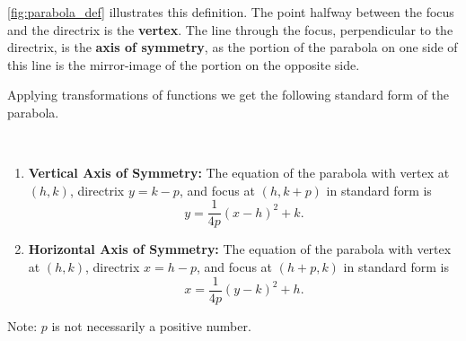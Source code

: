 \autoref{fig:parabola_def} illustrates this definition. The point halfway between the focus and the directrix is the \textbf{vertex}. The line through the focus, perpendicular to the directrix, is the \textbf{axis of symmetry}, as the portion of the parabola on one side of this line is the mirror-image of the portion on the opposite side.

\iftoggle{abridgeConics}{%
The geometric definition of the parabola and distance formula can be used to derive the quadratic function whose graph is a parabola with vertex at the origin.
\[y=\frac{1}{4p}x^2.\]
}{%
The definition leads us to an algebraic formula for the parabola. Let $P=(x,y)$ be a point on a parabola whose focus is at $F=(0,p)$ and whose directrix is at $y=-p$. (We'll assume for now that the focus lies on the $y$-axis; by placing the focus $p$ units above the $x$-axis and the directrix $p$ units below this axis, the vertex will be at $(0,0)$.)

We use the Distance Formula to find the distance $d_1$ between $F$ and $P$:
\[d_1=\sqrt{(x-0)^2+(y-p)^2}.\]
The distance $d_2$ from $P$ to the directrix is more straightforward:
\[d_2=y-(-p) = y+p.\]
These two distances are equal. Setting $d_1=d_2$, we can solve for $y$ in terms of $x$:
\begin{align*}
	d_1&= d_2 \\
	\sqrt{x^2+(y-p)^2} &= y+p \\
	\intertext{Now square both sides.}
	x^2+(y-p)^2 &= (y+p)^2 \\
	x^2+y^2-2yp+p^2 &= y^2+2yp+p^2\\
	x^2 &=4yp\\
	y&= \frac{1}{4p}x^2.
\end{align*}%
}
Applying transformations of functions we get the following standard form of the parabola.

\begin{keyidea}\label{idea:parabola}%
\mbox{}\\[-1.5\baselineskip]\parbox{\linewidth}{%
\begin{enumerate}
	\item	\textbf{Vertical Axis of Symmetry:} The equation of the parabola with vertex at $(h,k)$, directrix $y=k-p$, and focus at $(h,k+p)$ in standard form is \[y=\frac{1}{4p}(x-h)^2+k.\]
	\item	\textbf{Horizontal Axis of Symmetry:} The  equation of the parabola with vertex at $(h,k)$, directrix $x=h-p$, and focus at $(h+p,k)$ in standard form is \[x=\frac{1}{4p}(y-k)^2+h.\]
\end{enumerate}}
Note: $p$ is not necessarily a positive number.
\end{keyidea}

